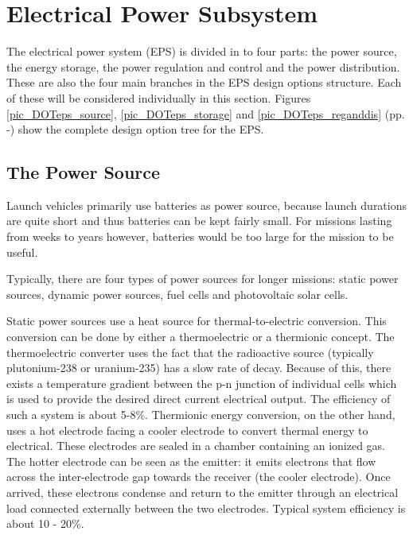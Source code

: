 \section{Electrical Power Subsystem}
\label{blDOEPS}

The electrical power system (EPS) is divided in to four parts: the power source, the energy storage, the power regulation and control and the power distribution. These are also the four main branches in the EPS design options structure. Each of these will be considered individually in this section. Figures \ref{pic_DOTeps_source}, \ref{pic_DOTeps_storage} and \ref{pic_DOTeps_reganddis} (pp. \pageref{pic_DOTeps_source}-\pageref{pic_DOTeps_reganddis}) show the complete design option tree for the EPS.

\subsection{The Power Source}
\label{blDOsource}

Launch vehicles primarily use batteries as power source, because launch durations are quite short and thus batteries can be kept fairly small. For missions lasting from weeks to years however, batteries would be too large for the mission to be useful.

Typically, there are four types of power sources for longer missions: static power sources, dynamic power sources, fuel cells and photovoltaic solar cells.

Static power sources use a heat source for thermal-to-electric conversion. This conversion can be done by either a thermoelectric or a thermionic
concept. The thermoelectric converter uses the fact that the radioactive source (typically plutonium-238 or uranium-235) has a slow rate of decay.
Because of this, there exists a temperature gradient between the p-n junction of individual cells which is used to provide the desired direct current electrical output. The efficiency of such a system is about 5-8\%.
Thermionic energy conversion, on the other hand, uses a hot electrode facing a cooler electrode to convert thermal energy to electrical.
These electrodes are sealed in a chamber containing an ionized gas. The hotter electrode can be seen as the emitter: it emits electrons that flow
across the inter-electrode gap towards the receiver (the cooler electrode). Once arrived, these electrons condense and return to the emitter through an electrical load connected externally between the two electrodes. Typical system efficiency is about 10 - 20\%.

